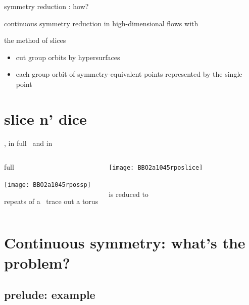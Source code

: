 \begin{frame}{symmetry reduction : how?}

\begin{block}{continuous symmetry reduction in high-dimensional flows}
{with }
\bigskip

\hfill {\Huge  the method of slices}
\end{block}

\bigskip

\begin{itemize}
  \item
cut group orbits by hypersurfaces
  \item
each group orbit of
symmetry-equivalent points represented by the single point
\end{itemize}
\end{frame}


\section[slice n' dice]{slice n' dice}

\begin{frame}{\rpo, in full \statesp\ and in \slice}
  \begin{columns}
\begin{block}{full \statesp}
\begin{center}
\texttt{[image: BBO2a1045rpossp]}
\end{center}
repeats of a \rpo\ trace out a torus
\end{block}
\begin{block}{\reducedsp}
\begin{center}
\texttt{[image: BBO2a1045rposlice]}
\end{center}
\rpo\ \\ is reduced to \po
\end{block}
\end{columns}
\end{frame}

\section[Das Problem]{Continuous symmetry: what's the problem?}
\subsection[{\cLf} example]{prelude: {\cLf} example}

